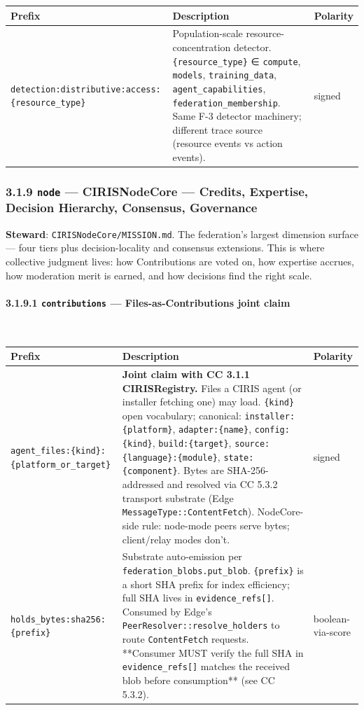 \documentclass[11pt]{article}
\begin{document}
{\footnotesize
\begin{longtable}{|p{5.33cm}|p{5.33cm}|p{5.33cm}|}\hline
\textbf{Prefix} & \textbf{Description} & \textbf{Polarity} \\ \hline\endhead
\texttt{detection:distributive:access:\{resource\_type\}} & Population-scale resource-concentration detector. \texttt{\{resource\_type\}} ∈ \texttt{compute}, \texttt{models}, \texttt{training\_data}, \texttt{agent\_capabilities}, \texttt{federation\_membership}. Same F-3 detector machinery; different trace source (resource events vs action events). & signed \\ \hline
\end{longtable}}


\subsubsection*{3.1.9 \texttt{node} — CIRISNodeCore — Credits, Expertise, Decision Hierarchy, Consensus, Governance}


\textbf{Steward}: \texttt{CIRISNodeCore/MISSION.md}. The federation's largest dimension surface — four tiers plus decision-locality and consensus extensions. This is where collective judgment lives: how Contributions are voted on, how expertise accrues, how moderation merit is earned, and how decisions find the right scale.


\paragraph{3.1.9.1 \texttt{contributions} — Files-as-Contributions joint claim}\mbox{}\\


{\footnotesize
\begin{longtable}{|p{5.33cm}|p{5.33cm}|p{5.33cm}|}\hline
\textbf{Prefix} & \textbf{Description} & \textbf{Polarity} \\ \hline\endhead
\texttt{agent\_files:\{kind\}:\{platform\_or\_target\}} & \textbf{Joint claim with CC 3.1.1 CIRISRegistry.} Files a CIRIS agent (or installer fetching one) may load. \texttt{\{kind\}} open vocabulary; canonical: \texttt{installer:\{platform\}}, \texttt{adapter:\{name\}}, \texttt{config:\{kind\}}, \texttt{build:\{target\}}, \texttt{source:\{language\}:\{module\}}, \texttt{state:\{component\}}. Bytes are SHA-256-addressed and resolved via CC 5.3.2 transport substrate (Edge \texttt{MessageType::ContentFetch}). NodeCore-side rule: node-mode peers serve bytes; client/relay modes don't. & signed \\ \hline
\texttt{holds\_bytes:sha256:\{prefix\}} & Substrate auto-emission per \texttt{federation\_blobs.put\_blob}. \texttt{\{prefix\}} is a short SHA prefix for index efficiency; full SHA lives in \texttt{evidence\_refs[]}. Consumed by Edge's \texttt{PeerResolver::resolve\_holders} to route \texttt{ContentFetch} requests. **Consumer MUST verify the full SHA in \texttt{evidence\_refs[]} matches the received blob before consumption** (see CC 5.3.2). & boolean-via-score \\ \hline
\end{longtable}}
\end{document}
